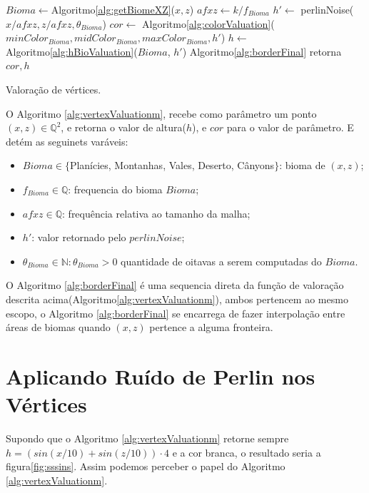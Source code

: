 \begin{algorithm}[H]\label{alg:vertexValuationm}%
    $Bioma \leftarrow $Algoritmo\ref{alg:getBiomeXZ}($x, z$)\;
    $afxz \leftarrow k/f_{Bioma}$\;
    $h' \leftarrow$ perlinNoise($x/afxz, z/afxz, \theta_{Bioma}$)\;
    $cor \leftarrow$ Algoritmo\ref{alg:colorValuation}($minColor_{Bioma}, midColor_{Bioma}, maxColor_{Bioma}, h'$)\;
    $h \leftarrow$ Algoritmo\ref{alg:hBioValuation}($Bioma$, $h'$)\;
    Algoritmo\ref{alg:borderFinal}\;
    retorna $cor, h$\;
    \caption{Valoração de vértices.}
\end{algorithm}
O Algoritmo \ref{alg:vertexValuationm}, recebe como parâmetro um
ponto $(x, z) \in \mathbb{Q}^{2}$, e retorna o valor de altura($h$), e $cor$ para o valor de parâmetro.
E detém as seguinets varáveis:
\begin{itemize}
    \item $Bioma \in \{$Planícies, Montanhas, Vales, Deserto, Cânyons$\}$: bioma de $(x, z)$;
    \item $f_{Bioma} \in \mathbb{Q}$: frequencia do bioma $Bioma$;
    \item $afxz \in \mathbb{Q}$: frequência relativa ao tamanho da malha;
    \item $h'$: valor retornado pelo $perlinNoise$;
    \item $\theta_{Bioma} \in \mathbb{N}: \theta_{Bioma} > 0$ quantidade de oitavas a serem computadas do $Bioma$.
\end{itemize}


O Algoritmo \ref{alg:borderFinal} é uma sequencia direta da função de valoração 
descrita acima(Algoritmo\ref{alg:vertexValuationm}), ambos pertencem ao mesmo escopo, o Algoritmo \ref{alg:borderFinal}
se encarrega de fazer interpolação entre áreas de biomas quando $(x, z)$ pertence
a alguma fronteira.

\section{Aplicando Ruído de Perlin nos Vértices}
Supondo que o Algoritmo \ref{alg:vertexValuationm} retorne sempre $h = (sin(x/10) + sin(z/10)) \cdot 4$ e 
a cor branca, o resultado seria a figura\ref{fig:sssins}. Assim podemos perceber o papel do Algoritmo \ref{alg:vertexValuationm}.


